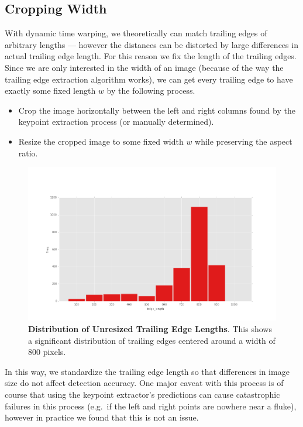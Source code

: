 \subsection{Cropping Width}


With dynamic time warping, we theoretically can match trailing edges of arbitrary lengths --- however the distances can be distorted by large differences in actual trailing edge length.
For this reason we fix the length of the trailing edges.
Since we are only interested in the width of an image (because of the way the trailing edge extraction algorithm works), we can get every trailing edge to have exactly some fixed length $w$ by the following process.

\begin{itemize}
    \item Crop the image horizontally between the left and right columns found by the keypoint extraction process (or manually determined).
    \item Resize the cropped image to some fixed width $w$ while preserving the aspect ratio.%
\end{itemize}

\begin{figure}[t]%
\centering
\includegraphics[width=1\textwidth]{../images/results/te_size_hist_fb.png}
\caption{\textbf{Distribution of Unresized Trailing Edge Lengths}. This shows a significant distribution of trailing edges centered around a width of 800 pixels.}
\label{fig:width_te_dist}
\end{figure}

In this way, we standardize the trailing edge length so that differences in image size do not affect detection accuracy.
One major caveat with this process is of course that using the keypoint extractor's predictions can cause catastrophic failures in this process (e.g.\ if the left and right points are nowhere near a fluke), however in practice we found that this is not an issue.

